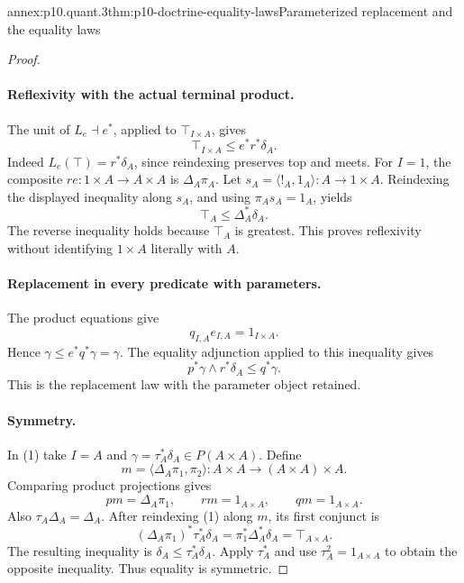 \begin{annexitem}{annex:p10.quant.3}{thm:p10-doctrine-equality-laws}{Parameterized replacement and the equality laws}
\begin{proof}
\paragraph{Reflexivity with the actual terminal product.}
The unit of \(L_e\dashv e^*\), applied to
\(\top_{I\times A}\), gives
\[
                 \top_{I\times A}\leq e^*r^*\delta_A.
\]
Indeed \(L_e(\top)=r^*\delta_A\), since reindexing preserves
top and meets.
For \(I=1\), the composite \(r e:1\times A\to A\times A\)
is \(\Delta_A\pi_A\).
Let \(s_A=\langle!_A,1_A\rangle:A\to1\times A\).
Reindexing the displayed inequality along \(s_A\), and using
\(\pi_A s_A=1_A\), yields
\[
                              \top_A\leq\Delta_A^*\delta_A.
\]
The reverse inequality holds because \(\top_A\) is greatest.
This proves reflexivity without identifying \(1\times A\)
literally with \(A\).

\paragraph{Replacement in every predicate with parameters.}
The product equations give
\[
                         q_{I,A}e_{I,A}=1_{I\times A}.
\]
Hence
\(\gamma\leq e^*q^*\gamma=\gamma\).
The equality adjunction applied to this inequality gives
\[
                          p^*\gamma\wedge r^*\delta_A\leq q^*\gamma.
                                                                  \tag{1}
\]
This is the replacement law with the parameter object retained.

\paragraph{Symmetry.}
In (1) take \(I=A\) and
\(\gamma=\tau_A^*\delta_A\in P(A\times A)\).
Define
\[
 m=\langle\Delta_A\pi_1,\pi_2\rangle:
                           A\times A\longrightarrow(A\times A)\times A.
\]
Comparing product projections gives
\[
                         p m=\Delta_A\pi_1,\qquad
                         r m=1_{A\times A},\qquad
                         q m=1_{A\times A}.
\]
Also \(\tau_A\Delta_A=\Delta_A\).
After reindexing (1) along \(m\), its first conjunct is
\[
             (\Delta_A\pi_1)^*\tau_A^*\delta_A
                        =\pi_1^*\Delta_A^*\delta_A=\top_{A\times A}.
\]
The resulting inequality is
\(\delta_A\leq\tau_A^*\delta_A\).
Apply \(\tau_A^*\) and use \(\tau_A^2=1_{A\times A}\)
to obtain the opposite inequality.  Thus equality is symmetric.


\end{proof}
\end{annexitem}
